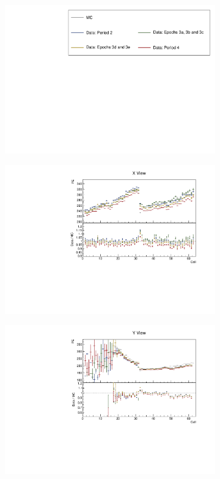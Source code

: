 \documentclass[12pt,a4paper]{article}
\begin{document}
\begin{figure}[h!]
  \begin{subfigure}{\textwidth}
  \centering
    \includegraphics[height=0.2\linewidth]{essentialsec_tb/legend.pdf}
  \end{subfigure}
  \vspace*{2mm}

  \begin{subfigure}{0.5\textwidth}
    \includegraphics[width=\linewidth]{essentialsec_tb/pe_cell_x.pdf}
  \end{subfigure}
  \begin{subfigure}{0.5\textwidth}
    \includegraphics[width=\linewidth]{essentialsec_tb/pe_cell_y.pdf}

\end{subfigure}
\end{figure}
\end{document}
